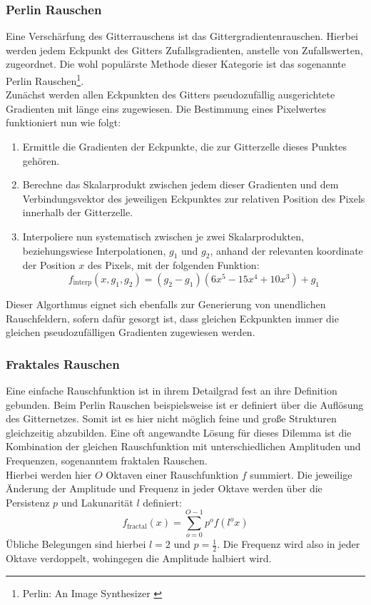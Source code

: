 \subsubsection{Perlin Rauschen}

Eine Verschärfung des Gitterrauschens ist das Gittergradientenrauschen. Hierbei werden jedem Eckpunkt des Gitters Zufallsgradienten, anstelle von Zufallswerten, zugeordnet. Die wohl populärste Methode dieser Kategorie ist das sogenannte Perlin Rauschen\footnote{
    Perlin: An Image Synthesizer
    \cite{perlin1985image}
}. \\
Zunächst werden allen Eckpunkten des Gitters pseudozufällig ausgerichtete Gradienten mit länge eins zugewiesen. Die Bestimmung eines Pixelwertes funktioniert nun wie folgt:
\begin{enumerate}
    \item Ermittle die Gradienten der Eckpunkte, die zur Gitterzelle dieses Punktes gehören.
    \item Berechne das Skalarprodukt zwischen jedem dieser Gradienten und dem Verbindungsvektor des jeweiligen Eckpunktes zur relativen Position des Pixels innerhalb der Gitterzelle.
    \item Interpoliere nun systematisch zwischen je zwei Skalarprodukten, beziehungswiese Interpolationen, $g_1$ und $g_2$, anhand der relevanten koordinate der Position $x$ des Pixels, mit der folgenden Funktion:
    \begin{equation}
        f_\text{interp}(x, g_1, g_2) = (g_2 - g_1)(6x^5 - 15x^4 + 10x^3) 
        + g_1
    \end{equation}
\end{enumerate}
Dieser Algorthmus eignet sich ebenfalls zur Generierung von unendlichen Rauschfeldern, sofern dafür gesorgt ist, dass gleichen Eckpunkten immer die gleichen pseudozufälligen Gradienten zugewiesen werden. 


\subsubsection{Fraktales Rauschen}

Eine einfache Rauschfunktion ist in ihrem Detailgrad fest an ihre Definition gebunden. Beim Perlin Rauschen beispielsweise ist er definiert über die Auflösung des Gitternetzes. Somit ist es hier nicht möglich feine und große Strukturen gleichzeitig abzubilden. Eine oft angewandte Lösung für dieses Dilemma ist die Kombination der gleichen Rauschfunktion mit unterschiedlichen Amplituden und Frequenzen, sogenanntem fraktalen Rauschen. \\
Hierbei werden hier $O$ Oktaven einer Rauschfunktion $f$ summiert. Die jeweilige Änderung der Amplitude und Frequenz in jeder Oktave werden über die Persistenz $p$ und Lakunarität $l$ definiert:  
\begin{equation}
    f_\text{fractal}(x) = \sum_{o=0}^{O-1} p^{o}f(l^ox)
\end{equation}
Übliche Belegungen sind hierbei $l=2$ und $p=\frac{1}{2}$. Die Frequenz wird also in jeder Oktave verdoppelt, wohingegen die Amplitude halbiert wird.

